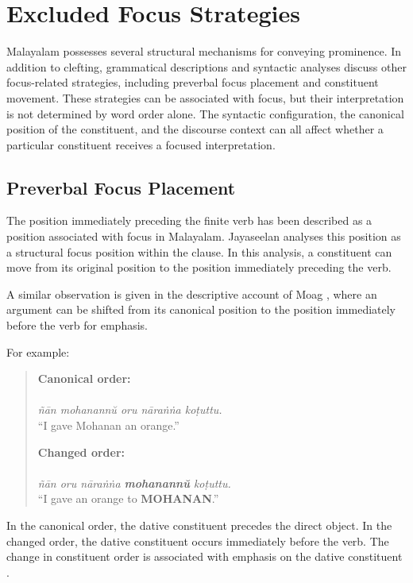 \chapter{Excluded Focus Strategies}
\label{chap:excluded_strategies}

Malayalam possesses several structural mechanisms for conveying prominence. In addition to clefting, grammatical descriptions and syntactic analyses discuss other focus-related strategies, including preverbal focus placement and constituent movement. These strategies can be associated with focus, but their interpretation is not determined by word order alone. The syntactic configuration, the canonical position of the constituent, and the discourse context can all affect whether a particular constituent receives a focused interpretation.

\section{Preverbal Focus Placement}
\label{sec:preverbal_focus}

The position immediately preceding the finite verb has been described as a position associated with focus in Malayalam. Jayaseelan \citep{jayaseelan2001ip,jayaseelan2023dravidian} analyses this position as a structural focus position within the clause. In this analysis, a constituent can move from its original position to the position immediately preceding the verb.

A similar observation is given in the descriptive account of Moag \citep[§5.4, p.~61]{moag2002malayalam}, where an argument can be shifted from its canonical position to the position immediately before the verb for emphasis.

For example:

\begin{quote}
\textbf{Canonical order:}\\
\\
\textit{ñān mohanannŭ oru nāraṅṅa koṭuttu.}\\
``I gave Mohanan an orange.''

\textbf{Changed order:}\\
\\
\textit{ñān oru nāraṅṅa \textbf{mohanannŭ} koṭuttu.}\\
``I gave an orange to \textbf{MOHANAN}.''
\end{quote}

In the canonical order, the dative constituent precedes the direct object. In the changed order, the dative constituent occurs immediately before the verb. The change in constituent order is associated with emphasis on the dative constituent \citep{moag2002malayalam}.

